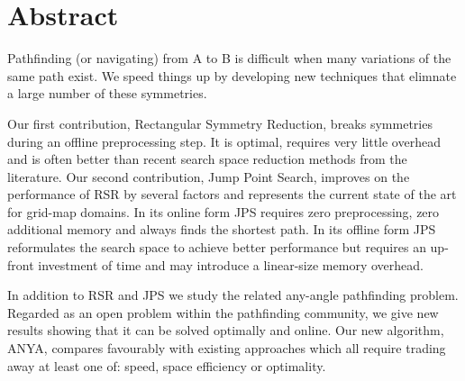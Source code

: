 \chapter*{Abstract}
\vspace{-1em}
Pathfinding (or navigating) from A to B is difficult when many variations of the same path exist. 
We speed things up by developing new techniques that elimnate a large number of these symmetries.
\par
Our first contribution, Rectangular Symmetry Reduction, breaks symmetries during an offline
preprocessing step. It is optimal, requires very little overhead and is often better than recent
search space reduction methods from the literature.
Our second contribution, Jump Point Search, improves on the performance of RSR by several factors
and represents the current state of the art for grid-map domains.
In its online form JPS requires zero preprocessing, zero additional memory and always finds the 
shortest path.
In its offline form JPS reformulates the search space to achieve better performance but requires
an up-front investment of time and may introduce a linear-size memory overhead.
\par
In addition to RSR and JPS we study the related any-angle pathfinding problem. Regarded as an 
open problem within the pathfinding community, we give new results 
showing that it can be solved optimally and online. Our new algorithm, ANYA, compares favourably
with existing approaches which all require trading away at least one of: 
speed, space efficiency or optimality.

